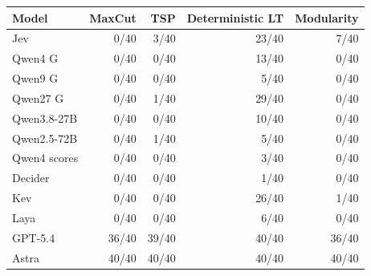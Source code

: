\begin{tabular}{lrrrr}
\toprule
Model & MaxCut & TSP & Deterministic LT & Modularity \\
\midrule
Jev & 0/40 & 3/40 & 23/40 & 7/40 \\
Qwen4 G & 0/40 & 0/40 & 13/40 & 0/40 \\
Qwen9 G & 0/40 & 0/40 & 5/40 & 0/40 \\
Qwen27 G & 0/40 & 1/40 & 29/40 & 0/40 \\
Qwen3.8-27B & 0/40 & 0/40 & 10/40 & 0/40 \\
Qwen2.5-72B & 0/40 & 1/40 & 5/40 & 0/40 \\
Qwen4 scores & 0/40 & 0/40 & 3/40 & 0/40 \\
Decider & 0/40 & 0/40 & 1/40 & 0/40 \\
Kev & 0/40 & 0/40 & 26/40 & 1/40 \\
Laya & 0/40 & 0/40 & 6/40 & 0/40 \\
\midrule
GPT-5.4 & 36/40 & 39/40 & 40/40 & 36/40 \\
Astra & 40/40 & 40/40 & 40/40 & 40/40 \\
\bottomrule
\end{tabular}
